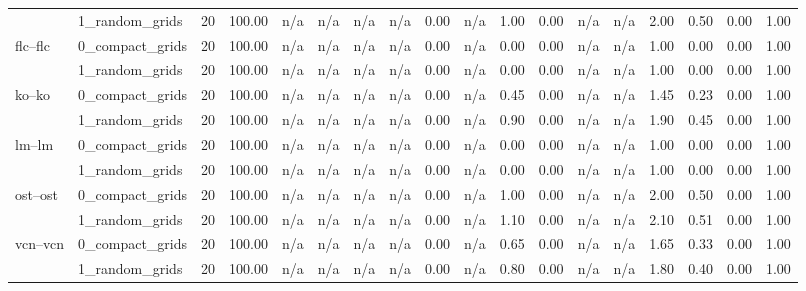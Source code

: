 \begin{tabular}{llrrrrrrrrrrrrrrrr}
 & 1_random_grids & 20 & 100.00 & n/a & n/a & n/a & n/a & 0.00 & n/a & 1.00 & 0.00 & n/a & n/a & 2.00 & 0.50 & 0.00 & 1.00 \\
\cline{1-18}
\multirow[t]{2}{*}{flc--flc} & 0_compact_grids & 20 & 100.00 & n/a & n/a & n/a & n/a & 0.00 & n/a & 0.00 & 0.00 & n/a & n/a & 1.00 & 0.00 & 0.00 & 1.00 \\
 & 1_random_grids & 20 & 100.00 & n/a & n/a & n/a & n/a & 0.00 & n/a & 0.00 & 0.00 & n/a & n/a & 1.00 & 0.00 & 0.00 & 1.00 \\
\cline{1-18}
\multirow[t]{2}{*}{ko--ko} & 0_compact_grids & 20 & 100.00 & n/a & n/a & n/a & n/a & 0.00 & n/a & 0.45 & 0.00 & n/a & n/a & 1.45 & 0.23 & 0.00 & 1.00 \\
 & 1_random_grids & 20 & 100.00 & n/a & n/a & n/a & n/a & 0.00 & n/a & 0.90 & 0.00 & n/a & n/a & 1.90 & 0.45 & 0.00 & 1.00 \\
\cline{1-18}
\multirow[t]{2}{*}{lm--lm} & 0_compact_grids & 20 & 100.00 & n/a & n/a & n/a & n/a & 0.00 & n/a & 0.00 & 0.00 & n/a & n/a & 1.00 & 0.00 & 0.00 & 1.00 \\
 & 1_random_grids & 20 & 100.00 & n/a & n/a & n/a & n/a & 0.00 & n/a & 0.00 & 0.00 & n/a & n/a & 1.00 & 0.00 & 0.00 & 1.00 \\
\cline{1-18}
\multirow[t]{2}{*}{ost--ost} & 0_compact_grids & 20 & 100.00 & n/a & n/a & n/a & n/a & 0.00 & n/a & 1.00 & 0.00 & n/a & n/a & 2.00 & 0.50 & 0.00 & 1.00 \\
 & 1_random_grids & 20 & 100.00 & n/a & n/a & n/a & n/a & 0.00 & n/a & 1.10 & 0.00 & n/a & n/a & 2.10 & 0.51 & 0.00 & 1.00 \\
\cline{1-18}
\multirow[t]{2}{*}{vcn--vcn} & 0_compact_grids & 20 & 100.00 & n/a & n/a & n/a & n/a & 0.00 & n/a & 0.65 & 0.00 & n/a & n/a & 1.65 & 0.33 & 0.00 & 1.00 \\
 & 1_random_grids & 20 & 100.00 & n/a & n/a & n/a & n/a & 0.00 & n/a & 0.80 & 0.00 & n/a & n/a & 1.80 & 0.40 & 0.00 & 1.00 \\
\cline{1-18}
\bottomrule
\end{tabular}
